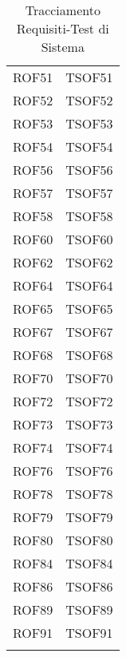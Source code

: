 \documentclass[../PianoDiQualifica.tex]{subfiles}
\begin{document}
\begin{longtable}[c] { >{\centering\arraybackslash}p{3cm} >{\centering\arraybackslash}p{3cm}}
			ROF51 & TSOF51 \\
			\addlinespace[0.3em]
			\midrule
			\addlinespace[0.3em]
			ROF52 & TSOF52 \\ 
			\addlinespace[0.3em]
			\midrule
			\addlinespace[0.3em]
			ROF53 & TSOF53 \\ 
			\addlinespace[0.3em]
			\midrule
			\addlinespace[0.3em]
			ROF54 & TSOF54 \\ 
			\addlinespace[0.3em]
			\midrule
			\addlinespace[0.3em]
			ROF56 & TSOF56 \\ 
			\addlinespace[0.3em]
			\midrule
			\addlinespace[0.3em]
			ROF57 & TSOF57 \\ 
			\addlinespace[0.3em]
			\midrule
			\addlinespace[0.3em]
			ROF58 & TSOF58 \\ 
			\addlinespace[0.3em]
			\midrule
			\addlinespace[0.3em]
			ROF60 & TSOF60 \\ 
			\addlinespace[0.3em]
			\midrule
			\addlinespace[0.3em]
			ROF62 & TSOF62 \\ 
			\addlinespace[0.3em]
			\midrule
			\addlinespace[0.3em]
			ROF64 & TSOF64 \\ 
			\addlinespace[0.3em]
			\midrule
			\addlinespace[0.3em]
			ROF65 & TSOF65 \\ 
			\addlinespace[0.3em]
			\midrule
			\addlinespace[0.3em]
			ROF67 & TSOF67 \\ 
			\addlinespace[0.3em]
			\midrule
			\addlinespace[0.3em]
			ROF68 & TSOF68 \\ 
			\addlinespace[0.3em]
			\midrule
			\addlinespace[0.3em]
			ROF70 & TSOF70 \\
			\addlinespace[0.3em]
			\midrule
			\addlinespace[0.3em] 
			ROF72 & TSOF72 \\ 
			\addlinespace[0.3em]
			\midrule
			\addlinespace[0.3em]
			ROF73 & TSOF73 \\ 
			\addlinespace[0.3em]
			\midrule
			\addlinespace[0.3em]
			ROF74 & TSOF74 \\ 
			\addlinespace[0.3em]
			\midrule
			\addlinespace[0.3em]
			ROF76 & TSOF76 \\ 
			\addlinespace[0.3em]
			\midrule
			\addlinespace[0.3em]
			ROF78 & TSOF78 \\ 
			\addlinespace[0.3em]
			\midrule
			\addlinespace[0.3em]
			ROF79 & TSOF79 \\ 
			\addlinespace[0.3em]
			\midrule
			\addlinespace[0.3em]
			ROF80 & TSOF80 \\ 
			\addlinespace[0.3em]
			\midrule
			\addlinespace[0.3em]
			ROF84 & TSOF84 \\ 
			\addlinespace[0.3em]
			\midrule
			\addlinespace[0.3em]
			ROF86 & TSOF86 \\ 
			\addlinespace[0.3em]
			\midrule
			\addlinespace[0.3em]
			ROF89 & TSOF89 \\ 
			\addlinespace[0.3em]
			\midrule
			\addlinespace[0.3em]
			ROF91 & TSOF91 \\ 
			\bottomrule
			\caption{Tracciamento Requisiti-Test di Sistema}
	\end{longtable}
\end{document}
